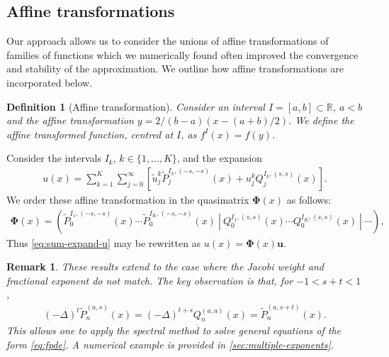 \documentclass[10pt,a4paper]{article}
\newcommand{\eP}{\tilde{P}}
\newtheorem{definition}{Definition}[section]
\newtheorem{remark}{Remark}[section]
\numberwithin{equation}{section}
\begin{document}
\subsection{Affine transformations}
Our approach allows us to consider the unions of affine transformations of families of functions which we numerically found often improved the convergence and stability of the approximation. We outline how affine transformations are incorporated below.
\begin{definition}[Affine transformation]
\label{def:affine}
Consider an interval $I = [a,b] \subset \mathbb{R}$, $a<b$ and the affine transformation $y=2/(b-a) (x-(a+b)/2)$. We define the affine transformed function, centred at $I$, as $f^{I}(x) = f(y)$.
\end{definition}

Consider the intervals $I_k$, $k \in \{1,\dots,K\}$, and the expansion
\begin{align}
u(x) = \sum_{k=1}^K \sum_{j=0}^\infty \left[\tilde{u}_j^k \tilde{P}^{I_k, (-s,-s)}_j(x) + u_j^k Q^{I_k, (s,s)}_j(x)\right].
\label{eq:sum-expand-u}
\end{align}
We order these affine transformation in the quasimatrix ${\bm \Phi}(x)$ as follows:
\begin{align}
{\bm \Phi}(x) = 
\left( 
\tilde{P}^{I_1, (-s,-s)}_0(x) \cdots  \tilde{P}^{I_K, (-s,-s)}_0(x) 
\ | \  Q^{I_1, (s,s)}_0(x) \cdots  Q^{I_K, (s,s)}_0(x)
\ | \ \cdots
\right),
\end{align}
Thus \cref{eq:sum-expand-u} may be rewritten as $u(x) = {\bm \Phi}(x) {\mathbf u}$.

\begin{remark}
These results extend to the case where the Jacobi weight and fractional exponent do not match. The key observation is that, for $-1 < s+t < 1$,
\begin{align}
(-\Delta)^t \eP_n^{(a,s)}(x) = (-\Delta)^{t+s} Q_n^{(a,a)}(x) = \eP_n^{(a,s+t)}(x).
\end{align}
This allows one to apply the spectral method to solve general equations of the form \cref{eq:fpde}. A numerical example is provided in \cref{sec:multiple-exponents}.
\end{remark}
\end{document}
